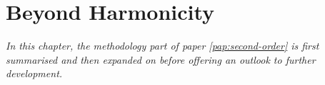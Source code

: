 \chapter{Beyond Harmonicity \pending}
\label{chap:erm}

\textit{In this chapter, the methodology part of paper \ref{pap:second-order} is first summarised and then expanded on before offering an outlook to further development.}





